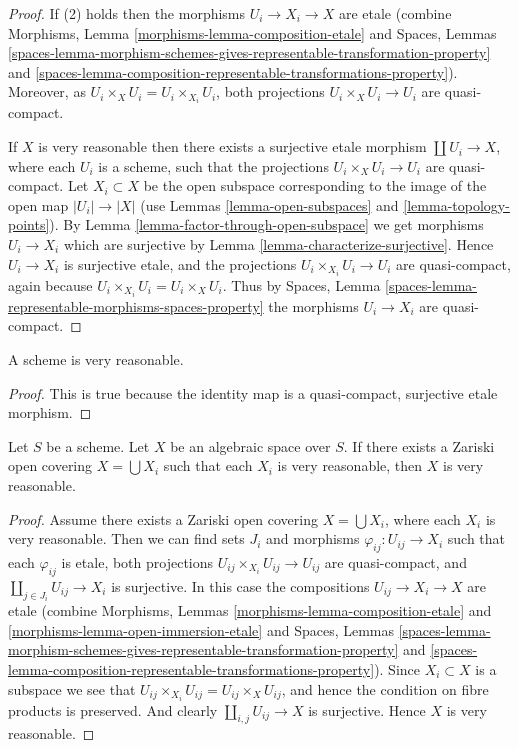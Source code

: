 \begin{proof}
If (2) holds then the morphisms $U_i \to X_i \to X$ are etale (combine
Morphisms, Lemma \ref{morphisms-lemma-composition-etale}
and
Spaces, Lemmas
\ref{spaces-lemma-morphism-schemes-gives-representable-transformation-property}
and
\ref{spaces-lemma-composition-representable-transformations-property}).
Moreover, as $U_i \times_X U_i = U_i \times_{X_i} U_i$,
both projections $U_i \times_X U_i \to U_i$ are quasi-compact.

\medskip\noindent
If $X$ is very reasonable then there exists a surjective etale morphism
$\coprod U_i \to X$, where each $U_i$ is a scheme, such that
the projections $U_i \times_X U_i \to U_i$ are quasi-compact.
Let $X_i \subset X$ be the open subspace corresponding to the image
of the open map $|U_i| \to |X|$ (use
Lemmas \ref{lemma-open-subspaces} and \ref{lemma-topology-points}).
By Lemma \ref{lemma-factor-through-open-subspace}
we get morphisms $U_i \to X_i$ which are
surjective by Lemma \ref{lemma-characterize-surjective}.
Hence $U_i \to X_i$ is surjective etale, and the projections
$U_i \times_{X_i} U_i \to U_i$ are quasi-compact, again because
$U_i \times_{X_i} U_i = U_i \times_X U_i$. Thus by
Spaces, Lemma \ref{spaces-lemma-representable-morphisms-spaces-property}
the morphisms $U_i \to X_i$ are quasi-compact.
\end{proof}

\begin{lemma}
\label{lemma-scheme-very-reasonable}
A scheme is very reasonable.
\end{lemma}

\begin{proof}
This is true because the identity map is a quasi-compact, surjective
etale morphism.
\end{proof}

\begin{lemma}
\label{lemma-very-reasonable-Zariski-local}
Let $S$ be a scheme.
Let $X$ be an algebraic space over $S$.
If there exists a Zariski open covering $X = \bigcup X_i$ such that
each $X_i$ is very reasonable, then $X$ is very reasonable.
\end{lemma}

\begin{proof}
Assume there exists a Zariski open covering
$X = \bigcup X_i$, where each $X_i$ is very reasonable.
Then we can find sets $J_i$ and morphisms
$\varphi_{ij} : U_{ij} \to X_i$ such that each $\varphi_{ij}$
is etale, both projections $U_{ij} \times_{X_i} U_{ij} \to U_{ij}$
are quasi-compact, and $\coprod_{j \in J_i} U_{ij} \to X_i$ is surjective.
In this case the compositions $U_{ij} \to X_i \to X$ are etale
(combine
Morphisms, Lemmas
\ref{morphisms-lemma-composition-etale}
and
\ref{morphisms-lemma-open-immersion-etale}
and
Spaces, Lemmas
\ref{spaces-lemma-morphism-schemes-gives-representable-transformation-property}
and
\ref{spaces-lemma-composition-representable-transformations-property}).
Since $X_i \subset X$ is a subspace we see that
$U_{ij} \times_{X_i} U_{ij} = U_{ij} \times_X U_{ij}$, and hence the
condition on fibre products is preserved. And clearly
$\coprod_{i, j} U_{ij} \to X$ is surjective. Hence $X$ is very reasonable.
\end{proof}

